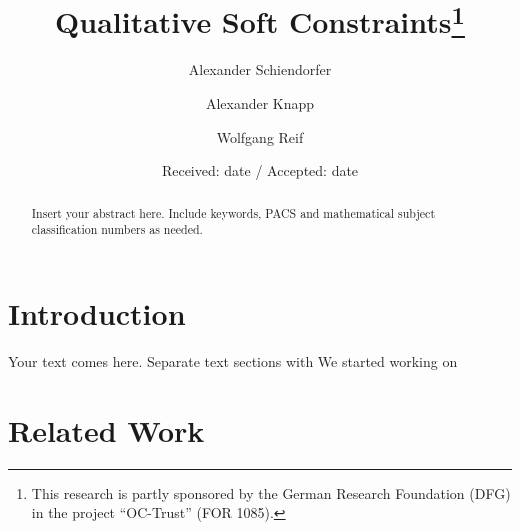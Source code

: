 \documentclass[smallcondensed]{svjour3}     %
\begin{document}
\title{Qualitative Soft Constraints\thanks{This research is partly sponsored by the 
German Research Foundation (DFG) in the project ``OC-Trust'' (FOR 1085).}
}


\author{Alexander Schiendorfer \and Alexander Knapp \and Wolfgang Reif %
}



\date{Received: date / Accepted: date}


\maketitle

\begin{abstract}
Insert your abstract here. Include keywords, PACS and mathematical
subject classification numbers as needed.
\end{abstract}

\section{Introduction}
\label{intro}
Your text comes here. Separate text sections with
We started working on \cite{Schiendorfer13}

\section{Related Work}
\label{sec:related-work}

\end{document}
